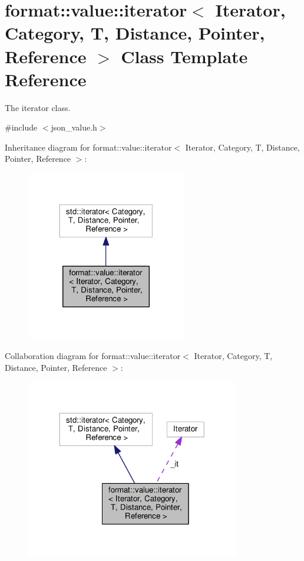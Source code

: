 \hypertarget{classformat_1_1value_1_1iterator}{}\section{format\+:\+:value\+:\+:iterator$<$ Iterator, Category, T, Distance, Pointer, Reference $>$ Class Template Reference}
\label{classformat_1_1value_1_1iterator}


The iterator class.  




{\ttfamily \#include $<$json\+\_\+value.\+h$>$}



Inheritance diagram for format\+:\+:value\+:\+:iterator$<$ Iterator, Category, T, Distance, Pointer, Reference $>$\+:
\nopagebreak
\begin{figure}[H]
\begin{center}
\leavevmode
\includegraphics[width=198pt]{classformat_1_1value_1_1iterator__inherit__graph}
\end{center}
\end{figure}


Collaboration diagram for format\+:\+:value\+:\+:iterator$<$ Iterator, Category, T, Distance, Pointer, Reference $>$\+:
\nopagebreak
\begin{figure}[H]
\begin{center}
\leavevmode
\includegraphics[width=264pt]{classformat_1_1value_1_1iterator__coll__graph}
\end{center}
\end{figure}

